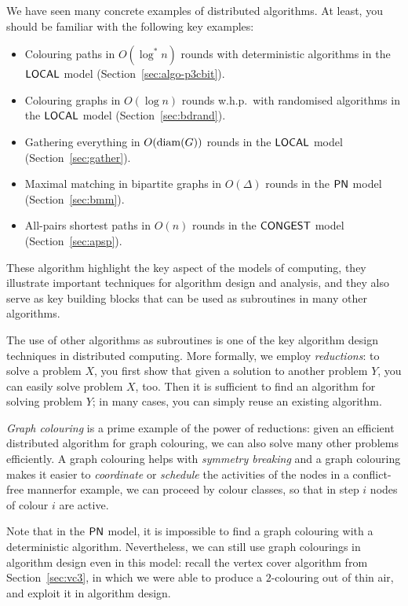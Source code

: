 We have seen many concrete examples of distributed algorithms. At least, you should be familiar with the following key examples:
\begin{itemize}
    \item Colouring paths in $O(\log^* n)$ rounds with deterministic algorithms in the $\textup{\sffamily LOCAL}$ model (Section~\ref{sec:algo-p3cbit}).
    \item Colouring graphs in $O(\log n)$ rounds w.h.p.\ with randomised algorithms in the $\textup{\sffamily LOCAL}$ model (Section~\ref{sec:bdrand}).
    \item Gathering everything in $O(\operatorname{diam}(G))$ rounds in the $\textup{\sffamily LOCAL}$ model (Section~\ref{sec:gather}).
    \item Maximal matching in bipartite graphs in $O(\Delta)$ rounds in the $\textup{\sffamily PN}$ model (Section~\ref{sec:bmm}).
    \item All-pairs shortest paths in $O(n)$ rounds in the $\textup{\sffamily CONGEST}$ model (Section~\ref{sec:apsp}).
\end{itemize}
These algorithm highlight the key aspect of the models of computing, they illustrate important techniques for algorithm design and analysis, and they also serve as key building blocks that can be used as subroutines in many other algorithms.

The use of other algorithms as subroutines is one of the key algorithm design techniques in distributed computing. More formally, we employ \emph{reductions}: to solve a problem $X$, you first show that given a solution to another problem $Y$, you can easily solve problem $X$, too. Then it is sufficient to find an algorithm for solving problem $Y$; in many cases, you can simply reuse an existing algorithm.

\emph{Graph colouring} is a prime example of the power of reductions: given an efficient distributed algorithm for graph colouring, we can also solve many other problems efficiently. A graph colouring helps with \emph{symmetry breaking} and a graph colouring makes it easier to \emph{coordinate} or \emph{schedule} the activities of the nodes in a conflict-free manner\mydash for example, we can proceed by colour classes, so that in step $i$ nodes of colour $i$ are active.

Note that in the $\textup{\sffamily PN}$ model, it is impossible to find a graph colouring with a deterministic algorithm. Nevertheless, we can still use graph colourings in algorithm design even in this model: recall the vertex cover algorithm from Section~\ref{sec:vc3}, in which we were able to produce a $2$-colouring out of thin air, and exploit it in algorithm design.


